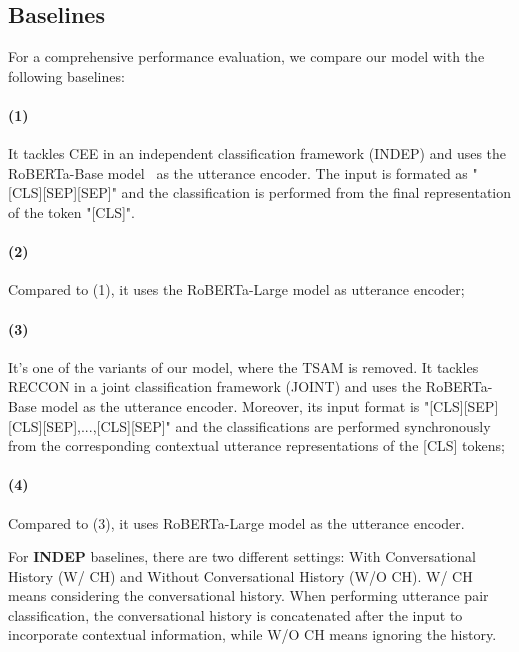 \documentclass[11pt]{article}
\begin{document}
\subsection{Baselines}
For a comprehensive performance evaluation, we compare our model with the following baselines:  

\paragraph{(1) }\citep{poria2021recognizing} It tackles CEE in an independent classification framework (INDEP) and uses the RoBERTa-Base model~\citep{liu2019roberta} as the utterance encoder. The input is formated as "[CLS][SEP][SEP]" and the classification is performed from the final representation of the token "[CLS]". \paragraph{(2) }\citep{poria2021recognizing} Compared to (1), it uses the RoBERTa-Large model as utterance encoder; 
\paragraph{(3) } It's one of the variants of our model, where the TSAM is removed. It tackles RECCON in a joint classification framework (JOINT) and uses the RoBERTa-Base model as the utterance encoder. Moreover, its input format is "[CLS][SEP][CLS][SEP],...,[CLS][SEP]" and the classifications are performed synchronously from the corresponding contextual utterance representations of the [CLS] tokens; 
\paragraph{(4) } Compared to (3), it uses RoBERTa-Large model as the utterance encoder.

For \textbf{INDEP} baselines, there are two different settings: With Conversational History (W/ CH) and Without Conversational History (W/O CH). W/ CH means considering the conversational history. When performing utterance pair classification, the conversational history  is concatenated after the input to incorporate contextual information, while W/O CH means ignoring the history.
\end{document}
